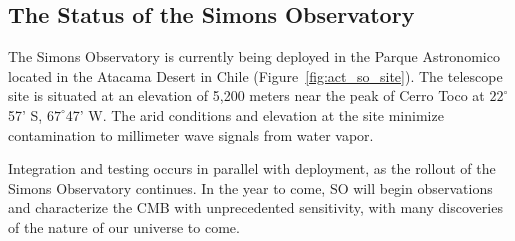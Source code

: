 \subsection{The Status of the Simons Observatory}

The Simons Observatory is currently being deployed in the Parque Astronomico located in the Atacama Desert in Chile (Figure~\ref{fig:act_so_site}). The telescope site is situated at an elevation of 5,200 meters near the peak of Cerro Toco at $22 ^\circ$ 57' S, $67^\circ$47' W.  The arid conditions and elevation at the site minimize contamination to millimeter wave signals from water vapor.

Integration and testing occurs in parallel with deployment, as the rollout of the Simons Observatory continues.  In the year to come, SO will begin observations and characterize the CMB with unprecedented sensitivity, with many discoveries of the nature of our universe to come.
